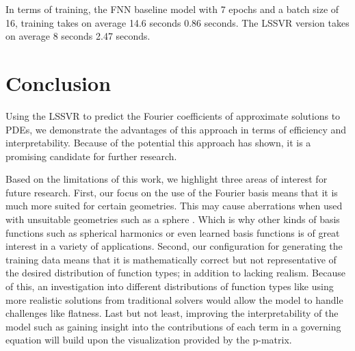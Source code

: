 \documentclass[preprint,12pt,times,authoryear]{elsarticle}
\begin{document}
In terms of training, the FNN baseline model with 7 epochs and a batch size of 16, training takes on average 14.6 seconds \pm{} 0.86 seconds. The LSSVR version takes on average 8 seconds \pm{} 2.47 seconds.

\section{Conclusion}
\noindent Using the LSSVR to predict the Fourier coefficients of approximate solutions to PDEs, we demonstrate the advantages of this approach in terms of efficiency and interpretability. Because of the potential this approach has shown, it is a promising candidate for further research.

Based on the limitations of this work, we highlight three areas of interest for future research. First, our focus on the use of the Fourier basis means that it is much more suited for certain geometries. This may cause aberrations when used with unsuitable geometries such as a sphere \citep{bonevSphericalFourierNeural2023}. Which is why other kinds of basis functions such as spherical harmonics or even learned basis functions is of great interest in a variety of applications. Second, our configuration for generating the training data means that it is mathematically correct \citep{roacheCodeVerificationMethod2002,salariCodeVerificationMethod2000,vedovotoApplicationMethodManufactured2011} but not representative of the desired distribution of function types; in addition to lacking realism. Because of this, an investigation into different distributions of function types like using more realistic solutions from traditional solvers would allow the model to handle challenges like flatness. Last but not least, improving the interpretability of the model such as gaining insight into the contributions of each term in a governing equation will build upon the visualization provided by the p-matrix.





\end{document}
